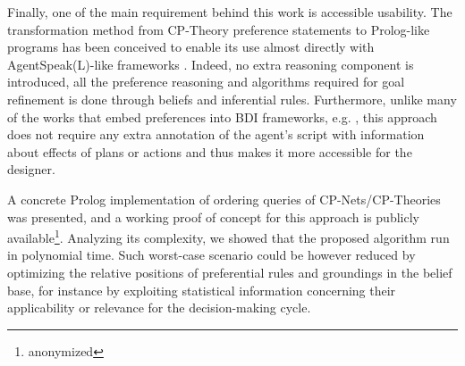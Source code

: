 Finally, one of the main requirement behind this work is accessible usability. The transformation method from CP-Theory preference statements to Prolog-like programs has been conceived to enable its use almost directly with AgentSpeak(L)-like frameworks \cite{Bordini2005,ASTRA,mohajeriparizi_2020_run,Aschermann2018}. Indeed, no extra reasoning component is introduced, all the preference reasoning and algorithms required for goal refinement is done through beliefs and inferential rules. Furthermore, unlike many of the works that embed preferences into BDI frameworks, e.g. \cite{Visser2011,Visser2016,Dasgupta2010,Mohajeri2019,Mohajeri2020}, this approach does not require any extra annotation of the agent's script with information about effects of plans or actions and thus makes it more accessible for the designer. 

A concrete Prolog implementation of ordering queries of CP-Nets/CP-Theories was presented, and a working proof of concept for this approach is publicly available\footnote{anonymized}. Analyzing its complexity, we showed that the proposed algorithm run in polynomial time. Such worst-case scenario could be however reduced by optimizing the relative positions of preferential rules and groundings in the belief base, for instance by exploiting statistical information concerning their applicability or relevance for the decision-making cycle. %




